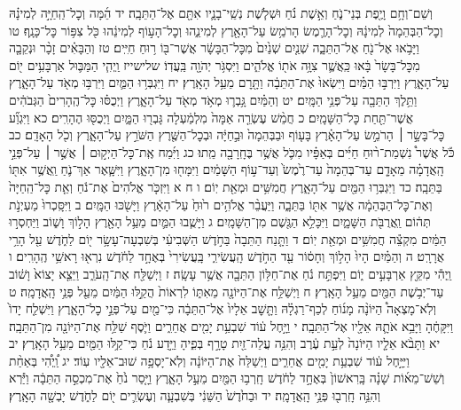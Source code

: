 \documentclass[twoside, openany, parskip=half, 11pt]{book}
\begin{document}
וְשֵׁם־וְחָ֥ם וָיֶ֖פֶת בְּנֵי־נֹ֑חַ וְאֵ֣שֶׁת נֹ֗חַ וּשְׁלֹ֧שֶׁת נְשֵֽׁי־בָנָ֛יו אִתָּ֖ם אֶל־הַתֵּבָֽה׃ יד הֵ֜מָּה וְכׇל־הַֽחַיָּ֣ה לְמִינָ֗הּ וְכׇל־הַבְּהֵמָה֙ לְמִינָ֔הּ וְכׇל־הָרֶ֛מֶשׂ הָרֹמֵ֥שׂ עַל־הָאָ֖רֶץ לְמִינֵ֑הוּ וְכׇל־הָע֣וֹף לְמִינֵ֔הוּ כֹּ֖ל צִפּ֥וֹר כׇּל־כָּנָֽף׃ טו וַיָּבֹ֥אוּ אֶל־נֹ֖חַ אֶל־הַתֵּבָ֑ה שְׁנַ֤יִם שְׁנַ֙יִם֙ מִכׇּל־הַבָּשָׂ֔ר אֲשֶׁר־בּ֖וֹ ר֥וּחַ חַיִּֽים׃ טז וְהַבָּאִ֗ים זָכָ֨ר וּנְקֵבָ֤ה מִכׇּל־בָּשָׂר֙ בָּ֔אוּ כַּֽאֲשֶׁ֛ר צִוָּ֥ה אֹת֖וֹ אֱלֹהִ֑ים וַיִּסְגֹּ֥ר יְהֹוָ֖ה בַּֽעֲדֽוֹ׃ שלישייז וַֽיְהִ֧י הַמַּבּ֛וּל אַרְבָּעִ֥ים י֖וֹם עַל־הָאָ֑רֶץ וַיִּרְבּ֣וּ הַמַּ֗יִם וַיִּשְׂאוּ֙ אֶת־הַתֵּבָ֔ה וַתָּ֖רׇם מֵעַ֥ל הָאָֽרֶץ׃ יח וַיִּגְבְּר֥וּ הַמַּ֛יִם וַיִּרְבּ֥וּ מְאֹ֖ד עַל־הָאָ֑רֶץ וַתֵּ֥לֶךְ הַתֵּבָ֖ה עַל־פְּנֵ֥י הַמָּֽיִם׃ יט וְהַמַּ֗יִם גָּ֥בְר֛וּ מְאֹ֥ד מְאֹ֖ד עַל־הָאָ֑רֶץ וַיְכֻסּ֗וּ כׇּל־הֶֽהָרִים֙ הַגְּבֹהִ֔ים אֲשֶׁר־תַּ֖חַת כׇּל־הַשָּׁמָֽיִם׃ כ חֲמֵ֨שׁ עֶשְׂרֵ֤ה אַמָּה֙ מִלְמַ֔עְלָה גָּבְר֖וּ הַמָּ֑יִם וַיְכֻסּ֖וּ הֶהָרִֽים׃ כא וַיִּגְוַ֞ע כׇּל־בָּשָׂ֣ר ׀ הָרֹמֵ֣שׂ עַל־הָאָ֗רֶץ בָּע֤וֹף וּבַבְּהֵמָה֙ וּבַ֣חַיָּ֔ה וּבְכׇל־הַשֶּׁ֖רֶץ הַשֹּׁרֵ֣ץ עַל־הָאָ֑רֶץ וְכֹ֖ל הָאָדָֽם׃ כב כֹּ֡ל אֲשֶׁר֩ נִשְׁמַת־ר֨וּחַ חַיִּ֜ים בְּאַפָּ֗יו מִכֹּ֛ל אֲשֶׁ֥ר בֶּחָֽרָבָ֖ה מֵֽתוּ׃ כג וַיִּ֜מַח אֶֽת־כׇּל־הַיְק֣וּם ׀ אֲשֶׁ֣ר ׀ עַל־פְּנֵ֣י הָֽאֲדָמָ֗ה מֵאָדָ֤ם עַד־בְּהֵמָה֙ עַד־רֶ֙מֶשׂ֙ וְעַד־ע֣וֹף הַשָּׁמַ֔יִם וַיִּמָּח֖וּ מִן־הָאָ֑רֶץ וַיִּשָּׁ֧אֶר אַךְ־נֹ֛חַ וַֽאֲשֶׁ֥ר אִתּ֖וֹ בַּתֵּבָֽה׃ כד וַיִּגְבְּר֥וּ הַמַּ֖יִם עַל־הָאָ֑רֶץ חֲמִשִּׁ֥ים וּמְאַ֖ת יֽוֹם׃ ו ח א וַיִּזְכֹּ֤ר אֱלֹהִים֙ אֶת־נֹ֔חַ וְאֵ֤ת כׇּל־הַֽחַיָּה֙ וְאֶת־כׇּל־הַבְּהֵמָ֔ה אֲשֶׁ֥ר אִתּ֖וֹ בַּתֵּבָ֑ה וַיַּעֲבֵ֨ר אֱלֹהִ֥ים ר֙וּחַ֙ עַל־הָאָ֔רֶץ וַיָּשֹׁ֖כּוּ הַמָּֽיִם׃ ב וַיִּסָּֽכְרוּ֙ מַעְיְנֹ֣ת תְּה֔וֹם וַֽאֲרֻבֹּ֖ת הַשָּׁמָ֑יִם וַיִּכָּלֵ֥א הַגֶּ֖שֶׁם מִן־הַשָּׁמָֽיִם׃ ג וַיָּשֻׁ֧בוּ הַמַּ֛יִם מֵעַ֥ל הָאָ֖רֶץ הָל֣וֹךְ וָשׁ֑וֹב וַיַּחְסְר֣וּ הַמַּ֔יִם מִקְצֵ֕ה חֲמִשִּׁ֥ים וּמְאַ֖ת יֽוֹם׃ ד וַתָּ֤נַח הַתֵּבָה֙ בַּחֹ֣דֶשׁ הַשְּׁבִיעִ֔י בְּשִׁבְעָה־עָשָׂ֥ר י֖וֹם לַחֹ֑דֶשׁ עַ֖ל הָרֵ֥י אֲרָרָֽט׃ ה וְהַמַּ֗יִם הָיוּ֙ הָל֣וֹךְ וְחָס֔וֹר עַ֖ד הַחֹ֣דֶשׁ הָֽעֲשִׂירִ֑י בָּֽעֲשִׂירִי֙ בְּאֶחָ֣ד לַחֹ֔דֶשׁ נִרְא֖וּ רָאשֵׁ֥י הֶֽהָרִֽים׃ ו וַֽיְהִ֕י מִקֵּ֖ץ אַרְבָּעִ֣ים י֑וֹם וַיִּפְתַּ֣ח נֹ֔חַ אֶת־חַלּ֥וֹן הַתֵּבָ֖ה אֲשֶׁ֥ר עָשָֽׂה׃ ז וַיְשַׁלַּ֖ח אֶת־הָֽעֹרֵ֑ב וַיֵּצֵ֤א יָצוֹא֙ וָשׁ֔וֹב עַד־יְבֹ֥שֶׁת הַמַּ֖יִם מֵעַ֥ל הָאָֽרֶץ׃ ח וַיְשַׁלַּ֥ח אֶת־הַיּוֹנָ֖ה מֵאִתּ֑וֹ לִרְאוֹת֙ הֲקַ֣לּוּ הַמַּ֔יִם מֵעַ֖ל פְּנֵ֥י הָֽאֲדָמָֽה׃ ט וְלֹֽא־מָצְאָה֩ הַיּוֹנָ֨ה מָנ֜וֹחַ לְכַף־רַגְלָ֗הּ וַתָּ֤שׇׁב אֵלָיו֙ אֶל־הַתֵּבָ֔ה כִּי־מַ֖יִם עַל־פְּנֵ֣י כׇל־הָאָ֑רֶץ וַיִּשְׁלַ֤ח יָדוֹ֙ וַיִּקָּחֶ֔הָ וַיָּבֵ֥א אֹתָ֛הּ אֵלָ֖יו אֶל־הַתֵּבָֽה׃ י וַיָּ֣חֶל ע֔וֹד שִׁבְעַ֥ת יָמִ֖ים אֲחֵרִ֑ים וַיֹּ֛סֶף שַׁלַּ֥ח אֶת־הַיּוֹנָ֖ה מִן־הַתֵּבָֽה׃ יא וַתָּבֹ֨א אֵלָ֤יו הַיּוֹנָה֙ לְעֵ֣ת עֶ֔רֶב וְהִנֵּ֥ה עֲלֵה־זַ֖יִת טָרָ֣ף בְּפִ֑יהָ וַיֵּ֣דַע נֹ֔חַ כִּי־קַ֥לּוּ הַמַּ֖יִם מֵעַ֥ל הָאָֽרֶץ׃ יב וַיִּיָּ֣חֶל ע֔וֹד שִׁבְעַ֥ת יָמִ֖ים אֲחֵרִ֑ים וַיְשַׁלַּח֙ אֶת־הַיּוֹנָ֔ה וְלֹֽא־יָסְפָ֥ה שׁוּב־אֵלָ֖יו עֽוֹד׃ יג וַֽ֠יְהִ֠י בְּאַחַ֨ת וְשֵׁשׁ־מֵא֜וֹת שָׁנָ֗ה בָּֽרִאשׁוֹן֙ בְּאֶחָ֣ד לַחֹ֔דֶשׁ חָֽרְב֥וּ הַמַּ֖יִם מֵעַ֣ל הָאָ֑רֶץ וַיָּ֤סַר נֹ֙חַ֙ אֶת־מִכְסֵ֣ה הַתֵּבָ֔ה וַיַּ֕רְא וְהִנֵּ֥ה חָֽרְב֖וּ פְּנֵ֥י הָֽאֲדָמָֽה׃ יד וּבַחֹ֙דֶשׁ֙ הַשֵּׁנִ֔י בְּשִׁבְעָ֧ה וְעֶשְׂרִ֛ים י֖וֹם לַחֹ֑דֶשׁ יָבְשָׁ֖ה הָאָֽרֶץ׃
\end{document}
